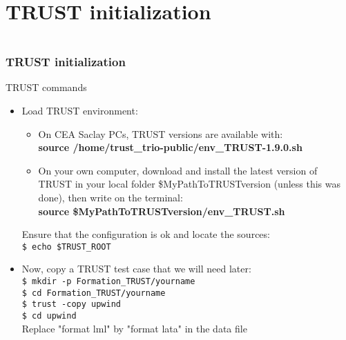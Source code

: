 \documentclass[10pt, hyperref={unicode=true,pdfusetitle, bookmarks=true,bookmarksnumbered=false,bookmarksopen=false, breaklinks=false,pdfborder={0 0 1},backref=true,colorlinks=true,linkcolor=darkblue,pageanchor, urlcolor=darkblue}]{beamer}
\begin{document}
\section{{\bf{TRUST initialization }}}
\begin{frame}
\begin{columns}[c] 
\tableofcontents[sections={1-4},currentsection, currentsubsection]
\tableofcontents[sections={5-10},currentsection, currentsubsection]
\end{columns}
\end{frame}
\begin{frame}
\frametitle{TRUST initialization}\label{initTrust}
\begin{block}{TRUST commands}

\begin{itemize}
\item Load TRUST environment:
\begin{itemize}
\item On CEA Saclay PCs, TRUST versions are available with:\\
\textbf{source  /home/trust\_trio-public/env\_TRUST-1.9.0.sh}
%
\item On your own computer, download and install the latest version of TRUST in your local folder \$MyPathToTRUSTversion (unless this was done), then write on the terminal:\\
%
\textbf{source  \$MyPathToTRUSTversion/env\_TRUST.sh}
%
\end{itemize}
%

Ensure that the configuration is ok and locate the sources:\\
\texttt{\$ echo \$TRUST\_ROOT}

\item Now, copy a TRUST test case that we will need later:\\
\texttt{\$ mkdir -p Formation\_TRUST/yourname}\\
\texttt{\$ cd Formation\_TRUST/yourname}\\
\texttt{\$ trust -copy upwind}\\
\texttt{\$ cd upwind}\\
Replace "format lml" by "format lata" in the data file\\
\end{itemize}

\end{block}
\end{frame}
\end{document}
